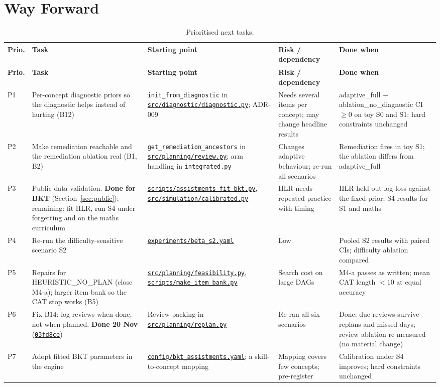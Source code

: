 \documentclass[english]{sintr}
\newcommand{\repourl}{https://github.com/Bhuvan-56/adaptive-learning-path-planner-DAT}
\newcommand{\sha}{cs5903-final-2026}
\DeclareRobustCommand{\rf}[1]{\href{\repourl/blob/\sha/#1}{\nolinkurl{#1}}}
\DeclareRobustCommand{\cm}[1]{\href{\repourl/commit/#1}{\texttt{#1}}}
\newcommand{\shax}{cs5903-final-2026}
\DeclareRobustCommand{\rfx}[1]{\href{\repourl/blob/\shax/#1}{\nolinkurl{#1}}}
\begin{document}
\section{Way Forward}
\label{sec:forward}
{\small
\begin{longtable}{|C{0.81cm}|L{3.23cm}|L{3.49cm}|L{2.69cm}|L{3.94cm}|}
\caption{Prioritised next tasks.}\\
\hline
\textbf{Prio.} & \textbf{Task} & \textbf{Starting point} & \textbf{Risk / dependency} & \textbf{Done when} \\ \hline
\endfirsthead
\hline \textbf{Prio.} & \textbf{Task} & \textbf{Starting point} & \textbf{Risk / dependency} & \textbf{Done when} \\ \hline
\endhead
P1 & Per-concept diagnostic priors so the diagnostic helps instead of hurting (B12) & \texttt{init\_from\_\allowbreak diagnostic} in \rf{src/diagnostic/diagnostic.py}; ADR-009 & Needs several items per concept; may change headline results & adaptive\_full $-$ ablation\_no\_diagnostic CI $\geq 0$ on toy S0 and S1; hard constraints unchanged \\ \hline
P2 & Make remediation reachable and the remediation ablation real (B1, B2) & \texttt{get\_remediation\_\allowbreak ancestors} in \rf{src/planning/review.py}; arm handling in \texttt{integrated.py} & Changes adaptive behaviour; re-run all scenarios & Remediation fires in toy S1; the ablation differs from adaptive\_full \\ \hline
P3 & Public-data validation. \textbf{Done for BKT} (Section~\ref{sec:public}); remaining: fit HLR, run S4 under forgetting and on the maths curriculum & \rfx{scripts/assistments_fit_bkt.py}, \rfx{src/simulation/calibrated.py} & HLR needs repeated practice with timing & HLR held-out log loss against the fixed prior; S4 results for S1 and maths \\ \hline
P4 & Re-run the difficulty-sensitive scenario S2 & \rf{experiments/beta_s2.yaml} & Low & Pooled S2 results with paired CIs; difficulty ablation compared \\ \hline
P5 & Repairs for HEURISTIC\_NO\_PLAN (close M4-a); larger item bank so the CAT stop works (B5) & \rf{src/planning/feasibility.py}, \rf{scripts/make_item_bank.py} & Search cost on large DAGs & M4-a passes as written; mean CAT length $<10$ at equal accuracy \\ \hline
P6 & Fix B14: log reviews when done, not when planned. \textbf{Done 20 Nov} (\cm{03fd8ce}) & Review packing in \rf{src/planning/replan.py} & Re-ran all six scenarios & Done: due reviews survive replans and missed days; review ablation re-measured (no material change) \\ \hline
P7 & Adopt fitted BKT parameters in the engine & \rfx{config/bkt_assistments.yaml}; a skill-to-concept mapping & Mapping covers few concepts; pre-register & Calibration under S4 improves; hard constraints unchanged \\ \hline
\end{longtable}
}
\end{document}
